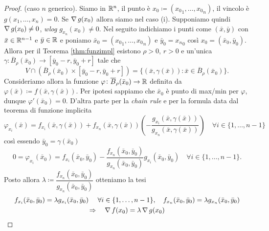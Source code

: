 \begin{proof}
	(caso $ n $ generico). Siamo in $ \mathbb{R}^n $, il punto è $ x_0 \coloneqq ({x_0}_1, \ldots, {x_0}_n) $, il vincolo è $ g(x_1, \ldots, x_n) = 0 $. Se $ \operatorname{\nabla}{g}(x_0) $ allora siamo nel caso (i). Supponiamo quindi $ \operatorname{\nabla}{g}(x_0) \neq 0 $, \emph{wlog} $ g_{x_n}(x_0) \neq 0 $. Nel seguito indichiamo i punti come $ (\bar{x}, \bar{y}) $ con $ \bar{x} \in \mathbb{R}^{n - 1} $ e $ \bar{y} \in \mathbb{R} $ e poniamo $ \bar{x}_0 = ({x_0}_1, \ldots, {x_0}_n) $ e $ \bar{y}_0 = {x_n}_0 $ così $ x_0 = (\bar{x}_0, \bar{y}_0) $. Allora per il Teorema \ref{thm:funzimpl} esistono $ \rho > 0 $, $ r > 0 $ e un'unica $ \gamma \colon \overline{B}_\rho(\bar{x}_0) \to [\bar{y}_0 - r, \bar{y}_0 + r] $ tale che 
	\[
		V \cap (\overline{B}_\rho(\bar{x}_0) \times [\bar{y}_0 - r, \bar{y}_0 + r]) = \{(\bar{x}, \gamma(\bar{x})) : \bar{x} \in \overline{B}_\rho(\bar{x}_0)\}.
	\]
	Consideriamo allora la funzione $ \varphi \colon \overline{B}_\rho(\bar{x}_0) \to \mathbb{R} $ definita da $ \varphi(\bar{x}) \coloneqq f(\bar{x}, \gamma{(\bar{x})}) $. Per ipotesi sappiamo che $ \bar{x}_0 $ è punto di max/min per $ \varphi $, dunque $ \varphi'(\bar{x}_0) = 0 $. D'altra parte per la \emph{chain rule} e per la formula data dal teorema di funzione implicita
	\[
		\varphi_{x_i}(\bar{x}) = f_{x_i}(\bar{x}, \gamma(\bar{x})) + f_{x_n}(\bar{x}, \gamma(\bar{x})) \left(- \frac{g_{x_i}(\bar{x}, \gamma(\bar{x}))}{g_{x_n}(\bar{x}, \gamma(\bar{x}))}\right) \quad \forall i \in \{1, \ldots, n - 1\}
	\]
	così essendo $ \bar{y}_0 = \gamma(\bar{x}_0) $
	\[
		0 = \varphi_{x_i}(\bar{x}_0) = f_{x_i}(\bar{x}_0, \bar{y}_0) - \frac{f_{x_n}(\bar{x}_0, \bar{y}_0)}{g_{x_n}(\bar{x}_0, \bar{y}_0)} g_{x_i}(\bar{x}_0, \bar{y}_0) \quad \forall i \in \{1, \ldots, n - 1\}.
	\]
	Posto allora $ \lambda \coloneqq \dfrac{f_{x_n}(\bar{x}_0, \bar{y}_0)}{g_{x_n}(\bar{x}_0, \bar{y}_0)} $ otteniamo la tesi
	\begin{gather*}
		f_{x_i}(\bar{x}_0, \bar{y}_0) = \lambda g_{x_i}(\bar{x}_0, \bar{y}_0) \ \quad \forall i \in \{1, \ldots, n - 1\}, \quad f_{x_n}(\bar{x}_0, \bar{y}_0) = \lambda g_{x_n}(\bar{x}_0, \bar{y}_0) \\
		\Rightarrow \quad \operatorname{\nabla}{f}(x_0) = \lambda \operatorname{\nabla}{g}(x_0) \qedhere
	\end{gather*}
\end{proof}

